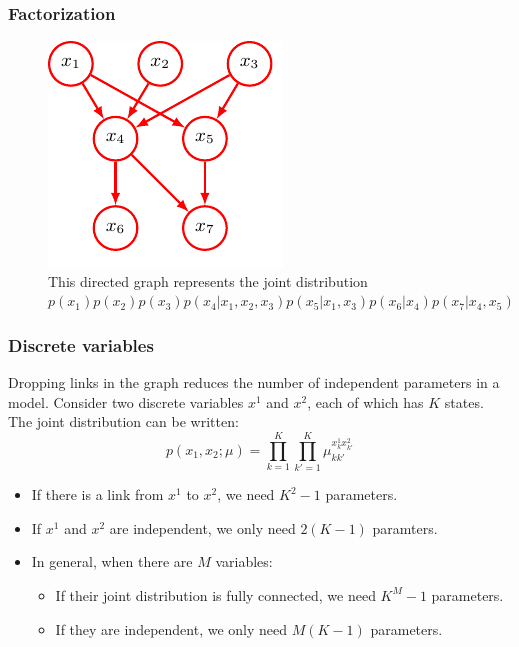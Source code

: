 \documentclass{beamer}
\begin{document}
\begin{frame}
    \frametitle{Factorization}
    \begin{figure}
        \caption{This directed graph represents the joint distribution $p(x_{1})p(x_{2})p(x_{3})p(x_{4}|x_{1},x_{2},x_{3})p(x_{5}|x_{1},x_{3})p(x_{6}|x_{4})p(x_{7}|x_{4},x_{5})$}
        \includegraphics{Figure_2.pdf}
    \end{figure}
\end{frame}

\begin{frame}
    \frametitle{Discrete variables}
    Dropping links in the graph reduces the number of independent parameters in a model. Consider two discrete variables $x^{1}$ and $x^{2}$, each of which has $K$ states. The joint distribution can be written:
    \begin{equation*}
        p(x_{1},x_{2};\mu)=\prod_{k=1}^{K}\prod_{k'=1}^{K}\mu_{kk'}^{x^{1}_{k}x^{2}_{k'}}
    \end{equation*}
    \begin{itemize}
        \item If there is a link from $x^{1}$ to $x^{2}$, we need $K^{2}-1$ parameters.
        \item If $x^{1}$ and $x^{2}$ are independent, we only need $2(K-1)$ paramters.
        \item In general, when there are $M$ variables:
        \begin{itemize}
            \item If their joint distribution is fully connected, we need $K^{M}-1$ parameters.
            \item If they are independent, we only need $M(K-1)$ parameters.
        \end{itemize}
    \end{itemize}
\end{frame}
\end{document}
